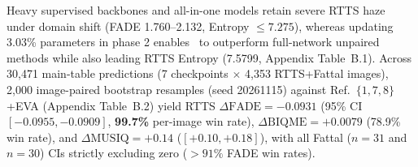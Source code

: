 \documentclass[10pt,twocolumn,letterpaper]{article}
\begin{document}
Heavy supervised backbones and all-in-one models retain severe RTTS haze under domain shift (FADE 1.760--2.132, Entropy $\le 7.275$), whereas updating 3.03\% parameters in phase 2 enables \method~to outperform full-network unpaired methods while also leading RTTS Entropy (7.5799, Appendix Table~B.1). Across 30,471 main-table predictions (7 checkpoints $\times$ 4,353 RTTS+Fattal images), 2,000 image-paired bootstrap resamples (seed 20261115) against Ref.~\(\{1,7,8\}\)+EVA (Appendix Table~B.2) yield RTTS $\Delta\mathrm{FADE}=-0.0931$ (95\% CI $[-0.0955,-0.0909]$, \textbf{99.7\%} per-image win rate), $\Delta\mathrm{BIQME}=+0.0079$ (78.9\% win rate), and $\Delta\mathrm{MUSIQ}=+0.14$ ($[+0.10,+0.18]$), with all Fattal ($n=31$ and $n=30$) CIs strictly excluding zero ($>91\%$ FADE win rates).
\end{document}
